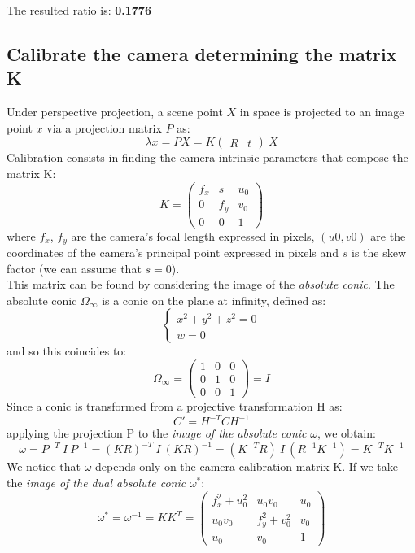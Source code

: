 \documentclass{article}
\begin{document}
The resulted ratio is: \textbf{0.1776}

\newpage
\subsection{Calibrate the camera determining the matrix K}
Under perspective projection, a scene point $X$ in space is projected to an image point $x$ via a projection matrix $P$ as:
\begin{equation}
\lambda x = PX = K \begin{pmatrix} R & t \end{pmatrix} \: X
\end{equation}
Calibration consists in finding the camera intrinsic parameters that compose the matrix K:
$$ K = \begin{pmatrix}
f_x & s & u_0 \\
0 & f_y & v_0 \\
0 & 0 & 1
\end{pmatrix}
$$
where $f_x$, $f_y$ are the camera’s focal length expressed in pixels, $(u0, v0)$ are the coordinates of the camera’s principal point expressed in pixels and $s$ is the skew factor (we can assume that $s = 0$).\\
This matrix can be found by considering the image of the \textit{absolute conic}. The absolute conic $\Omega_\infty$ is a conic on the plane at infinity, defined as:
$$ \begin{cases}
x^2 + y^2 + z^2 = 0 \\
w = 0
\end{cases}
$$
and so this coincides to:
$$
\Omega_\infty = \begin{pmatrix}
1 & 0 & 0 \\
0 & 1 & 0 \\
0 & 0 & 1
\end{pmatrix} = I
$$
Since a conic is transformed from a projective transformation H as:
$$ C' = H^{-T} C H^{-1} $$
applying the projection P to the \textit{image of the absolute conic} $\omega$, we obtain:
$$
\omega = P^{-T} \: I \: P^{-1} = (KR)^{-T} \: I \: (KR)^{-1} = (K^{-T}R) \: I \: (R^{-1}K^{-1}) = K^{-T}K^{-1}
$$
We notice that $\omega$ depends only on the camera calibration matrix K.
If we take the \textit{image of the dual absolute conic} $\omega^*$:
$$ \omega^* = \omega^{-1} = KK^T = \begin{pmatrix}
f_x^2+u_0^2 & u_0v_0 & u_0 \\
u_0v_0 & f_y^2+v_0^2 & v_0 \\
u_0 & v_0 & 1
\end{pmatrix}
$$
\end{document}
